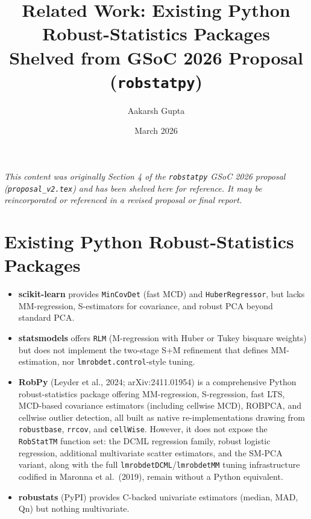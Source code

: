\documentclass[11pt, a4paper]{article}
\title{\textbf{Related Work: Existing Python Robust-Statistics Packages}\\
  \large Shelved from GSoC 2026 Proposal (\texttt{robstatpy})}
\author{Aakarsh Gupta}
\date{March 2026}
\begin{document}
\maketitle

\noindent\textit{This content was originally Section 4 of the
\texttt{robstatpy} GSoC 2026 proposal (\texttt{proposal\_v2.tex}) and
has been shelved here for reference. It may be reincorporated or
referenced in a revised proposal or final report.}

\bigskip

\section*{Existing Python Robust-Statistics Packages}

\begin{itemize}[leftmargin=1.5em, itemsep=4pt]
  \item \textbf{scikit-learn} provides \texttt{MinCovDet} (fast MCD)
    and \texttt{HuberRegressor}, but lacks MM-regression, S-estimators
    for covariance, and robust PCA beyond standard PCA.

  \item \textbf{statsmodels} offers \texttt{RLM} (M-regression with
    Huber or Tukey bisquare weights) but does not implement the
    two-stage S+M refinement that defines MM-estimation, nor
    \texttt{lmrobdet.control}-style tuning.

  \item \textbf{RobPy} (Leyder et al., 2024; arXiv:2411.01954) is a
    comprehensive Python robust-statistics package offering
    MM-regression, S-regression, fast LTS, MCD-based covariance
    estimators (including cellwise MCD), ROBPCA, and cellwise outlier
    detection, all built as native re-implementations drawing from
    \texttt{robustbase}, \texttt{rrcov}, and \texttt{cellWise}.
    However, it does not expose the \texttt{RobStatTM} function set:
    the DCML regression family, robust logistic regression, additional
    multivariate scatter estimators, and the SM-PCA variant, along
    with the full \texttt{lmrobdetDCML}/\texttt{lmrobdetMM} tuning
    infrastructure codified in Maronna et al.\ (2019), remain without
    a Python equivalent.

  \item \textbf{robustats} (PyPI) provides C-backed univariate
    estimators (median, MAD, Qn) but nothing multivariate.
\end{itemize}
\end{document}

